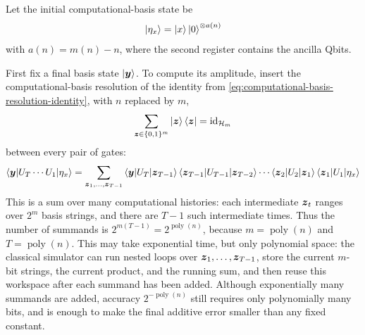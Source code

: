 \pagebreak[3]

Let the initial computational-basis state be
\[
\ket{\eta_x}
=
\ket{x}\ket{0}^{\otimes a(n)}
\]
with $a(n)=m(n)-n$,
where the second register contains the ancilla Qbits.


First fix a final basis state \(\ket{{\boldsymbol{y}}}\).
To compute its amplitude, insert the computational-basis resolution of the identity from \eqref{eq:computational-basis-resolution-identity}, with \(n\) replaced by \(m\),
\[
\sum_{{\boldsymbol{z}}\in\{0,1\}^{m}}\ket{{\boldsymbol{z}}}\bra{{\boldsymbol{z}}}
=
\operatorname{id}_{\mathcal H_m}
\]
between every pair of gates:
\begin{equation}\label{eq:history-sum}
\braket{{\boldsymbol{y}}|U_T\cdots U_1|\eta_x}
=
\sum_{{\boldsymbol{z}}_1,\ldots,{\boldsymbol{z}}_{T-1}}
\braket{{\boldsymbol{y}}|U_T|{\boldsymbol{z}}_{T-1}}
\braket{{\boldsymbol{z}}_{T-1}|U_{T-1}|{\boldsymbol{z}}_{T-2}}
\cdots
\braket{{\boldsymbol{z}}_2|U_2|{\boldsymbol{z}}_1}
\braket{{\boldsymbol{z}}_1|U_1|\eta_x}
\end{equation}
This is a sum over many computational histories:
each intermediate \({\boldsymbol{z}}_t\) ranges over \(2^m\) basis strings, and there are \(T-1\) such intermediate times.
Thus the number of summands is
\(
2^{m(T-1)}
=
2^{\operatorname{poly}(n)}
\),
because \(m=\operatorname{poly}(n)\) and \(T=\operatorname{poly}(n)\).
This may take exponential time, but only polynomial space:
the classical simulator can run nested loops over
\(
{\boldsymbol{z}}_1,\ldots,{\boldsymbol{z}}_{T-1}
\),
store the current \(m\)-bit strings, the current product, and the running sum, and then reuse this workspace after each summand has been added.
Although exponentially many summands are added, accuracy \(2^{-\operatorname{poly}(n)}\) still requires only polynomially many bits, and is enough to make the final additive error smaller than any fixed constant.



